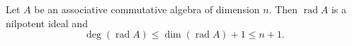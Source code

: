 Let $A$ be an associative commutative algebra of dimension $n$. Then $\operatorname{rad} A$ is a nilpotent ideal and
$$
\deg(\operatorname{rad} A) \leq \dim(\operatorname{rad} A) + 1 \leq n + 1.
$$
